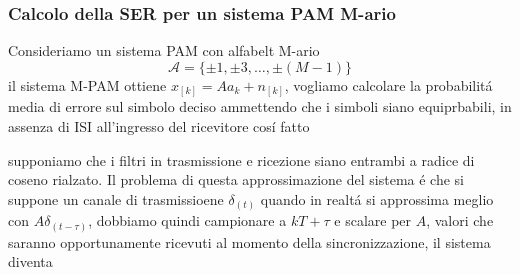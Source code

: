         \subsubsection{Calcolo della SER per un sistema PAM M-ario}
            Consideriamo un sistema PAM con alfabelt M-ario
            \[
                \mathcal{A} = \{\pm 1,\pm 3,\dots, \pm(M-1)\}  
            \]
            il sistema M-PAM ottiene $x_{[k]} = Aa_k + n_{[k]}$,
            vogliamo calcolare la probabilitá media di errore sul simbolo deciso ammettendo che i simboli 
            siano equiprbabili, in assenza di ISI all'ingresso del ricevitore cosí fatto
            \begin{figure}[H]
                \centering
            \end{figure}                    
            supponiamo che i filtri in trasmissione e ricezione siano entrambi a radice di coseno rialzato. Il problema di questa 
            approssimazione del sistema é che si suppone un canale di trasmissioene $\delta_{(t)}$ quando in realtá si approssima
            meglio con $A\delta_{(t-\tau)}$, dobbiamo quindi campionare a $kT+\tau$ e scalare per $A$, valori che saranno 
            opportunamente ricevuti al momento della sincronizzazione, il sistema diventa 
